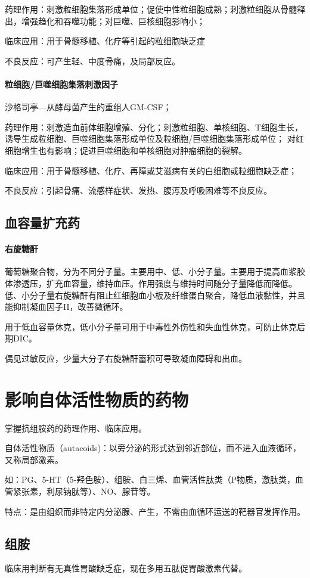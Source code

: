 \documentclass[UTF8]{ctexbook}
\begin{document}
药理作用：刺激粒细胞集落形成单位；促使中性粒细胞成熟；刺激粒细胞从骨髓释出，增强趋化和吞噬功能；对巨噬、巨核细胞影响小；

临床应用：用于骨髓移植、化疗等引起的粒细胞缺乏症

不良反应：可产生轻、中度骨痛，及局部反应。
\subsubsection{粒细胞/巨噬细胞集落刺激因子}
沙格司亭—从酵母菌产生的重组人GM-CSF；

药理作用：刺激造血前体细胞增殖、分化；刺激粒细胞、单核细胞、T细胞生长，诱导生成粒细胞、巨噬细胞集落形成单位及粒细胞/巨噬细胞集落形成单位；
对红细胞增生也有影响；促进巨噬细胞和单核细胞对肿瘤细胞的裂解。

临床应用：用于骨髓移植、化疗、再障或艾滋病有关的白细胞或粒细胞缺乏症；

不良反应：引起骨痛、流感样症状、发热、腹泻及呼吸困难等不良反应。

\section{血容量扩充药}
\subsubsection{右旋糖酐}
葡萄糖聚合物，分为不同分子量。主要用中、低、小分子量。主要用于提高血浆胶体渗透压，扩充血容量，维持血压。作用强度与维持时间随分子量降低而降低。
低、小分子量右旋糖酐有阻止红细胞血小板及纤维蛋白聚合，降低血液黏性，并且能抑制凝血因子II，改善微循环。

用于低血容量休克，低小分子量可用于中毒性外伤性和失血性休克，可防止休克后期DIC。

偶见过敏反应，少量大分子右旋糖酐蓄积可导致凝血障碍和出血。

\chapter{影响自体活性物质的药物}
掌握抗组胺药的药理作用、临床应用。

自体活性物质（autacoids)：以旁分泌的形式达到邻近部位，而不进入血液循环，又称局部激素。

如：PG、5-HT（5-羟色胺）、组胺、白三烯、血管活性肽类（P物质，激肽类，血管紧张素，利尿钠肽等）、NO、腺苷等。

特点：是由组织而非特定内分泌腺、产生，不需由血循环运送的靶器官发挥作用。
\section{组胺}
临床用判断有无真性胃酸缺乏症，现在多用五肽促胃酸激素代替。
\end{document}

